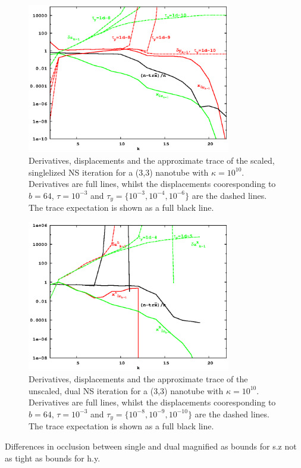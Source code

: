 \documentclass[letterpaper,twocolumn,amsmath,amsfont,amssymb,english,aps,jcp,preprintnumbers,groupaddress,nofootinbib,tightenlines,floatfix]{revtex4}
\theoremstyle{plain}
\theoremstyle{remark}
\theoremstyle{plain}
\begin{document}
\begin{figure}[h] \label{flow_scaled_dual}
\includegraphics[width=3.5in]{fig_33_tube_cond_10_scaled/33_tube_k10_scale_dual.eps}
\caption{Derivatives, displacements and the approximate trace of the scaled, singlelized NS iteration for a
(3,3) nanotube with $\kappa =10^{10}$.
Derivatives are full lines, whilst the displacements cooresponding to $b=64$,
$\tau=10^{-3}$ and $\tau_y=\{10^{-3},10^{-4},10^{-6}\}$
are the dashed lines.  The trace expectation is shown as a full black line. }
\end{figure}

\begin{figure}[h]\label{flow_scaled_stab}
\includegraphics[width=3.5in]{fig_33_tube_cond_10_scaled/33_tube_k10_scale_stab.eps}
\caption{Derivatives, displacements and the approximate trace of the unscaled, dual NS iteration for a (3,3) nanotube with $\kappa =10^{10}$.
Derivatives are full lines, whilst the displacements cooresponding to $b=64$, $\tau=10^{-3}$ and $\tau_y=\{10^{-8}, 10^{-9}, 10^{-10}\}$
are the dashed lines.  The trace expectation is shown as a full black line. }
\end{figure}

Differences in occlusion between single and dual magnified as bounds for s.z not as tight as bounds for h.y.
\end{document}
